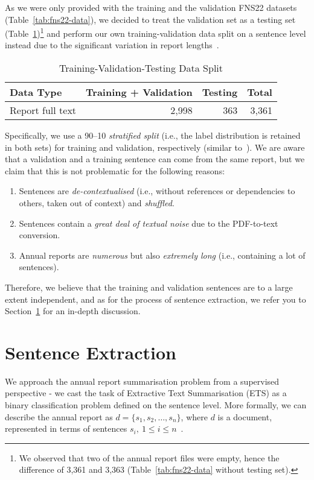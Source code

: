 As we were only provided with the training and the validation FNS22 datasets (Table~\ref{tab:fns22-data}),
we decided to treat the validation set as a testing set (Table~\ref{tab:fns22-my-data})\footnote{
    We observed that two of the annual report files were empty, hence the difference of 3,361 and 3,363 (Table~\ref{tab:fns22-data} without testing set).
} and perform our own training-validation data split on a sentence level instead due to the significant variation in report lengths~\cite{litvak-vanetik-2021-summarization}.
\begin{table}[h]
    \centering
    \begin{tabular}{lrr r}
        \hline
        Data Type & Training + Validation & Testing & Total \\
        \midrule
        Report full text & 2,998 & 363 & 3,361 \\
        \bottomrule
    \end{tabular}
    \caption{Training-Validation-Testing Data Split}
    \label{tab:fns22-my-data}
\end{table}
Specifically, we use a 90--10 \emph{stratified split} (i.e., the label distribution is retained in both sets) for training and validation, respectively (similar to~\cite{stepisnik-perdih-etal-2022-sentiment}).
We are aware that a validation and a training sentence can come from the same report, but we claim that this is not problematic for the following reasons:
\begin{enumerate}
    \item Sentences are \emph{de-contextualised} (i.e., without references or dependencies to others, taken out of context) and \emph{shuffled}.
    \item Sentences contain a \emph{great deal of textual noise} due to the PDF-to-text conversion.
    \item Annual reports are \emph{numerous} but also \emph{extremely long} (i.e., containing a lot of sentences).
\end{enumerate}
Therefore, we believe that the training and validation sentences are to a large extent independent, and as for the process of sentence extraction, we refer you to Section~\ref{sec:sentence_extraction} for an in-depth discussion.

\section{Sentence Extraction}\label{sec:sentence_extraction}
We approach the annual report summarisation problem from a supervised perspective - we cast the task of Extractive Text Summarisation (ETS) as a binary classification problem defined on the sentence level.
More formally, we can describe the annual report as $d=\{s_{1}, s_{2}, \dots, s_{n}\}$, where $d$ is a document, represented in terms of sentences $s_{i}, \  1 \leq i \leq n$~\cite{liu2019finetuningbert}.

